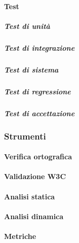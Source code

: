 		\paragraph{Test}
			\subparagraph{Test di unità}
			\subparagraph{Test di integrazione}
			\subparagraph{Test di sistema}
			\subparagraph{Test di regressione}					
			\subparagraph{Test di accettazione}
	\subsubsection{Strumenti}
			\paragraph{Verifica ortografica}
			\paragraph{Validazione W3C}
			\paragraph{Analisi statica}
			\paragraph{Analisi dinamica}
			\paragraph{Metriche}
			